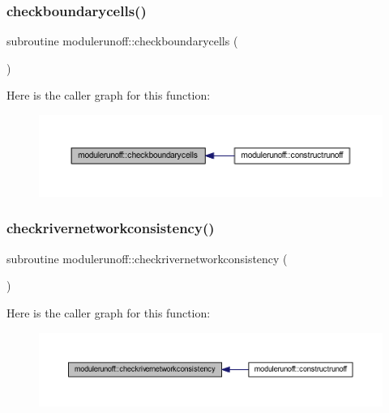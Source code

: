 \subsubsection{\texorpdfstring{checkboundarycells()}{checkboundarycells()}}
{\footnotesize\ttfamily subroutine modulerunoff\+::checkboundarycells (\begin{DoxyParamCaption}{ }\end{DoxyParamCaption})\hspace{0.3cm}{\ttfamily [private]}}

Here is the caller graph for this function\+:\nopagebreak
\begin{figure}[H]
\begin{center}
\leavevmode
\includegraphics[width=350pt]{namespacemodulerunoff_a56a143bff3b48f116a7cef30352f962e_icgraph}
\end{center}
\end{figure}
\mbox{\label{namespacemodulerunoff_aea1e4fa9f8992257e2f3d4f38cd3953d}} 
\subsubsection{\texorpdfstring{checkrivernetworkconsistency()}{checkrivernetworkconsistency()}}
{\footnotesize\ttfamily subroutine modulerunoff\+::checkrivernetworkconsistency (\begin{DoxyParamCaption}{ }\end{DoxyParamCaption})\hspace{0.3cm}{\ttfamily [private]}}

Here is the caller graph for this function\+:\nopagebreak
\begin{figure}[H]
\begin{center}
\leavevmode
\includegraphics[width=350pt]{namespacemodulerunoff_aea1e4fa9f8992257e2f3d4f38cd3953d_icgraph}
\end{center}
\end{figure}
\mbox{\label{namespacemodulerunoff_a330dcdf852e8d32ad8f61027fca5572d}} 
